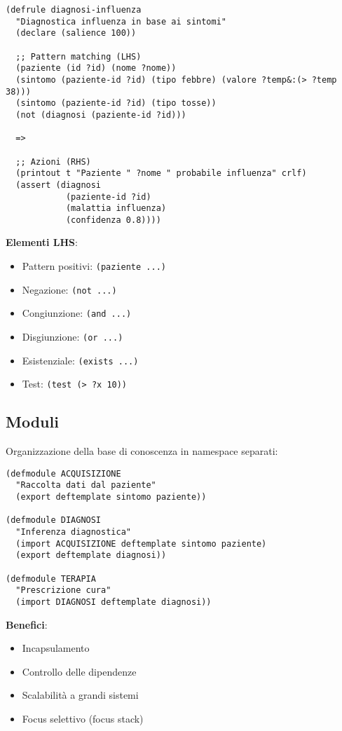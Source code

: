 \begin{lstlisting}[language=CLIPS]
(defrule diagnosi-influenza
  "Diagnostica influenza in base ai sintomi"
  (declare (salience 100))
  
  ;; Pattern matching (LHS)
  (paziente (id ?id) (nome ?nome))
  (sintomo (paziente-id ?id) (tipo febbre) (valore ?temp&:(> ?temp 38)))
  (sintomo (paziente-id ?id) (tipo tosse))
  (not (diagnosi (paziente-id ?id)))
  
  =>
  
  ;; Azioni (RHS)
  (printout t "Paziente " ?nome " probabile influenza" crlf)
  (assert (diagnosi 
            (paziente-id ?id) 
            (malattia influenza)
            (confidenza 0.8))))
\end{lstlisting}

\textbf{Elementi LHS}:
\begin{itemize}
\item Pattern positivi: \texttt{(paziente ...)}
\item Negazione: \texttt{(not ...)}
\item Congiunzione: \texttt{(and ...)}
\item Disgiunzione: \texttt{(or ...)}
\item Esistenziale: \texttt{(exists ...)}
\item Test: \texttt{(test (> ?x 10))}
\end{itemize}

\subsection{Moduli}

Organizzazione della base di conoscenza in namespace separati:

\begin{lstlisting}[language=CLIPS]
(defmodule ACQUISIZIONE
  "Raccolta dati dal paziente"
  (export deftemplate sintomo paziente))

(defmodule DIAGNOSI
  "Inferenza diagnostica"
  (import ACQUISIZIONE deftemplate sintomo paziente)
  (export deftemplate diagnosi))

(defmodule TERAPIA
  "Prescrizione cura"
  (import DIAGNOSI deftemplate diagnosi))
\end{lstlisting}

\textbf{Benefici}:
\begin{itemize}
\item Incapsulamento
\item Controllo delle dipendenze
\item Scalabilità a grandi sistemi
\item Focus selettivo (focus stack)
\end{itemize}

